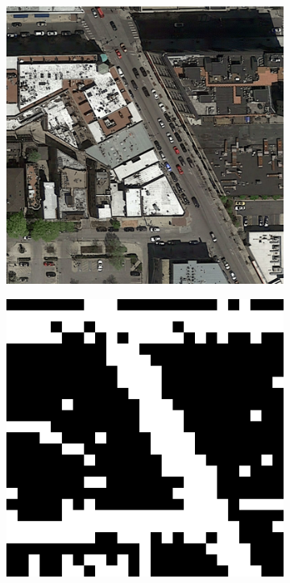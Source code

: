 \documentclass[10pt,conference,compsocconf]{IEEEtran}
\begin{document}
\begin{figure}[ht]
    \centering
    \begin{subfigure}{0.20\textwidth}
        \centering
        \includegraphics[width=0.9\linewidth]{doc/images/shadow_input.png}
    \end{subfigure}
    \begin{subfigure}{0.20\linewidth}
        \centering
        \includegraphics[width=0.9\linewidth]{doc/images/shadow_cnn.png}

\end{subfigure}
\end{figure}
\end{document}
